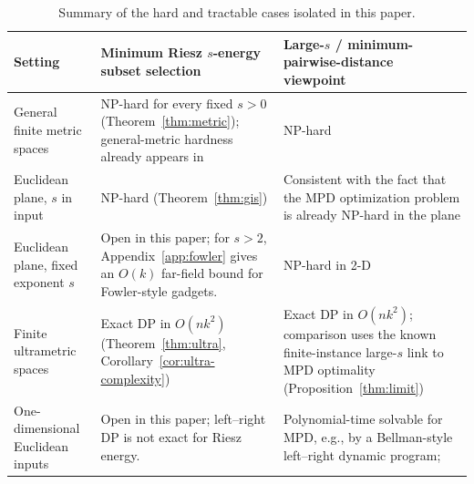 \documentclass[11pt]{article}
\begin{document}
\begin{table}[t]
\centering
\small
\begin{tabular}{p{5cm}p{5cm}p{4.3cm}}
\toprule
Setting & Minimum Riesz $s$-energy subset selection & Large-$s$ / minimum-pairwise-distance viewpoint \\
\midrule
General finite metric spaces & NP-hard for every fixed $s>0$ (Theorem~\ref{thm:metric}); general-metric hardness already appears in \cite{PereverdievaEtAl2025} & NP-hard \cite{agarwal2006computing} \\
Euclidean plane, $s$ in input & NP-hard (Theorem~\ref{thm:gis}) & Consistent with the fact that the MPD optimization problem is already NP-hard in the plane \\
Euclidean plane, fixed exponent $s$  & Open in this paper; for $s>2$, Appendix~\ref{app:fowler} gives an $O(k)$ far-field bound for Fowler-style gadgets. & NP-hard in 2-D \cite{agarwal2006computing} \\
Finite ultrametric spaces & Exact DP in $O(nk^2)$  (Theorem~\ref{thm:ultra}, Corollary~\ref{cor:ultra-complexity}) &  Exact DP in $O(nk^2)$; comparison uses the known finite-instance large-$s$ link to MPD optimality (Proposition~\ref{thm:limit}) \\
One-dimensional Euclidean inputs & Open in this paper; left--right DP is not exact for Riesz energy. & Polynomial-time solvable for MPD, e.g., by a Bellman-style left--right dynamic program;  \\
\bottomrule
\end{tabular}
\caption{Summary of the hard and tractable cases isolated in this paper.}
\label{tab:landscape}
\end{table}
\end{document}
